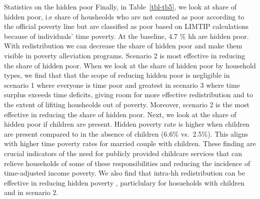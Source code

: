 \documentclass[
  11pt,
]{article}
\begin{document}
Statistics on the hidden poor Finally, in Table~\ref{tbl-tb5}, we look
at share of hidden poor, i.e share of housheolds who are not counted as
poor according to the official poverty line but are classified as poor
based on LIMTIP calculations because of individuals' time poverty. At
the baseline, 4.7 \% hh are hidden poor. With redistribution we can
decrease the share of hidden poor and make them visible in poverty
alleviation programs. Scenario 2 is most effective in reducing the share
of hidden poor. When we look at the share of hidden poor by household
types, we find that that the scope of reducing hidden poor is negligible
in scenario 1 where everyone is time poor and greatest in scenario 3
where time surplus exceeds time deficits, giving room for more effective
redistribution and to the extent of lifiting housheolds out of poverty.
Moreover, scenario 2 is the most effective in reducing the share of
hidden poor. Next, we look at the share of hidden poor if children are
present. Hidden poverty rate is higher when children are present
compared to in the absence of children (6.6\% vs.~2.5\%). This aligns
with higher time poverty rates for married couple with children. These
finding are crucial indicators of the need for publicly provided
childcare services that can relieve households of some of these
responsibilities and reducing the incidence of time-adjusted income
poverty. We also find that intra-hh redistribution can be effective in
reducing hidden poverty , particlulary for hosueholds with children and
in scenario 2.
\end{document}
